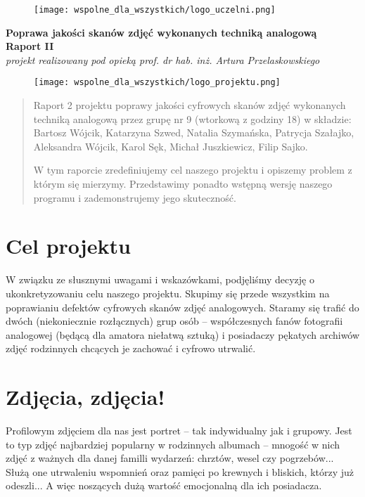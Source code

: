 \documentclass[]{mwart}
\begin{document}
\thispagestyle{empty}

\begin{figure}[h]
    \centering
    \texttt{[image: wspolne\_dla\_wszystkich/logo\_uczelni.png]}
\end{figure}


\begin{center}
    {\LARGE \textbf{Poprawa jakości skanów zdjęć wykonanych techniką analogową
        }} \\[0.3cm]
    {\large \textbf{Raport II}} \\[0.2cm]
    \textit{projekt realizowany pod opieką prof. dr hab. inż. Artura Przelaskowskiego}

\end{center}

\begin{figure}[h]
    \centering
    \texttt{[image: wspolne\_dla\_wszystkich/logo\_projektu.png]}
\end{figure}

\vfill
\begin{abstract}
    Raport 2 projektu poprawy jakości cyfrowych skanów zdjęć wykonanych techniką analogową przez grupę nr 9 (wtorkową z godziny 18)
    w składzie:  Bartosz Wójcik, Katarzyna Szwed, Natalia Szymańska,
    Patrycja Szałajko, Aleksandra Wójcik, Karol Sęk, Michał Juszkiewicz, Filip Sajko.

    W tym raporcie zredefiniujemy cel naszego projektu i opiszemy problem z którym się mierzymy.
    Przedstawimy ponadto wstępną wersję naszego programu i zademonstrujemy jego skuteczność.
\end{abstract}

\newpage
\tableofcontents{}

\newpage

\section{Cel projektu}
W związku ze słusznymi uwagami i wskazówkami, podjęliśmy decyzję o ukonkretyzowaniu celu naszego projektu.
Skupimy się przede wszystkim na poprawianiu defektów cyfrowych skanów zdjęć analogowych.
Staramy się trafić do dwóch (niekoniecznie rozłącznych) grup osób --
współczesnych fanów fotografii analogowej (będącą dla amatora niełatwą sztuką) i posiadaczy pękatych
archiwów zdjęć rodzinnych chcących je zachować i cyfrowo utrwalić.

\section{Zdjęcia, zdjęcia!}
Profilowym zdjęciem dla nas jest portret -- tak indywidualny jak i grupowy.
Jest to typ zdjęć najbardziej popularny w rodzinnych albumach -- mnogość w nich zdjęć z ważnych
dla danej familli wydarzeń: chrztów, wesel czy pogrzebów... Służą one utrwaleniu wspomnień oraz pamięci
po krewnych i bliskich, którzy już odeszli... A więc noszących dużą wartość emocjonalną dla ich posiadacza.
\end{document}
